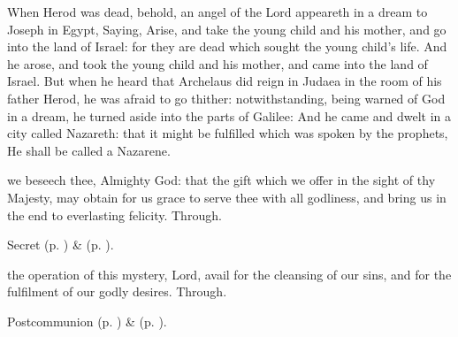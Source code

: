 
\clearpage
{}
 When Herod was dead, behold, an angel of the Lord appeareth in a dream to Joseph in Egypt, Saying, Arise, and take the young child and his mother, and go into the land of Israel: for they are dead which sought the young child's life. And he arose, and took the young child and his mother, and came into the land of Israel. But when he heard that Archelaus did reign in Judaea in the room of his father Herod, he was afraid to go thither: notwithstanding, being warned of God in a dream, he turned aside into the parts of Galilee: And he came and dwelt in a city called Nazareth: that it might be fulfilled which was spoken by the prophets, He shall be called a Nazarene.


\secret
{} we beseech thee, Almighty God: that the gift which we offer in the sight of thy Majesty, may obtain for us grace to serve thee with all godliness, and bring us in the end to everlasting felicity. Through.

\begin{rubric}
	 Secret  (p. \pageref{TelesphorusSecret}) \&   (p. \pageref{SPMaryPostChristmas}).
\end{rubric}


\postcommunion
{} the operation of this mystery, Lord, avail for the cleansing of our sins, and for the fulfilment of our godly desires. Through.


\begin{rubric}
	 Postcommunion  (p. \pageref{TelesphorusPostcommunion}) \&   (p. \pageref{SPMaryPostChristmas}).
\end{rubric}


